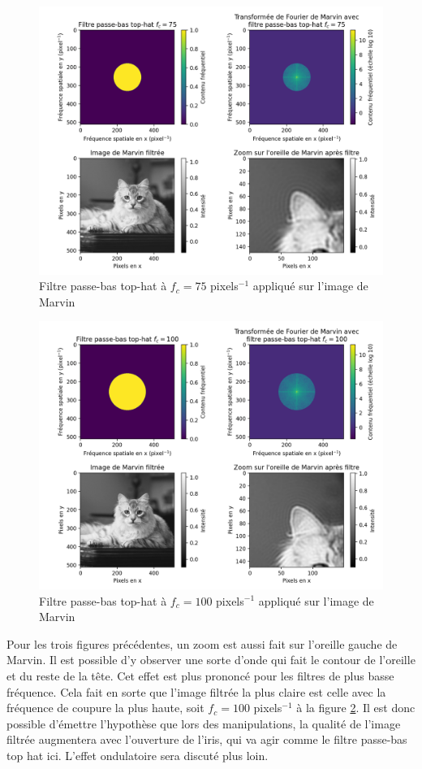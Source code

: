 \documentclass[11pt,letterpaper]{article}
\begin{document}
\begin{figure}[H]
  \centering
  \includegraphics[scale=0.7]{marvin_post_filter_fc_75.png}
  \caption{Filtre passe-bas top-hat à $f_c = 75$ pixels$^{-1}$ appliqué sur l'image de Marvin}
  \label{fc75}
\end{figure}

\begin{figure}[H]
  \centering
  \includegraphics[scale=0.7]{marvin_post_filter_fc_100.png}
  \caption{Filtre passe-bas top-hat à $f_c = 100$ pixels$^{-1}$ appliqué sur l'image de Marvin}
  \label{fc100}
\end{figure}

Pour les trois figures précédentes, un zoom est aussi fait sur l'oreille gauche de Marvin. Il est possible d'y observer une sorte d'onde qui fait le contour de l'oreille et du reste de la tête. Cet effet est plus prononcé pour les filtres de plus basse fréquence. Cela fait en sorte que l'image filtrée la plus claire est celle avec la fréquence de coupure la plus haute, soit $f_c=100$ pixels$^{-1}$ à la figure \ref{fc100}. Il est donc possible d'émettre l'hypothèse que lors des manipulations, la qualité de l'image filtrée augmentera avec l'ouverture de l'iris, qui va agir comme  le filtre passe-bas top hat ici. L'effet ondulatoire sera discuté plus loin.
\end{document}
